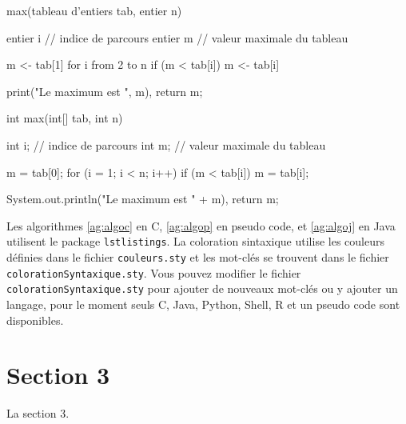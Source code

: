 \begin{algorithm}
  \begin{PseudoCode}
    max(tableau d'entiers tab, entier n) {
        entier i // indice de parcours
        entier m // valeur maximale du tableau

        m <- tab[1]
        for i from 2 to n {
            if (m < tab[i]) {
                m <- tab[i]
              }
          }

        print("Le maximum est ", m),
        return m;
      }
  \end{PseudoCode}
  \caption[Algo en PseudoCode]{Retourne la valeur maximale du tableau tab.\label{ag:algop}}
\end{algorithm}

\begin{algorithm}
  \begin{Java}
    int max(int[] tab, int n) {
        int i; // indice de parcours
        int m; // valeur maximale du tableau

        m = tab[0];
        for (i = 1; i < n; i++) {
            if (m < tab[i]) {
                m = tab[i];
              }
          }

        System.out.println("Le maximum est " + m),
        return m;
      }
  \end{Java}
  \caption[Algo en Java]{Retourne la valeur maximale du tableau tab.\label{ag:algoj}}
\end{algorithm}

Les algorithmes \ref{ag:algoc} en C, \ref{ag:algop} en pseudo code, et \ref{ag:algoj} en Java utilisent le package \texttt{lstlistings}. La coloration sintaxique utilise les couleurs définies dans le fichier \texttt{couleurs.sty} et les mot-clés se trouvent dans le fichier \texttt{colorationSyntaxique.sty}. Vous pouvez modifier le fichier \texttt{colorationSyntaxique.sty} pour ajouter de nouveaux mot-clés ou y ajouter un langage, pour le moment seuls C, Java, Python, Shell, R et un pseudo code sont disponibles.

\section{Section 3}

La section 3.


